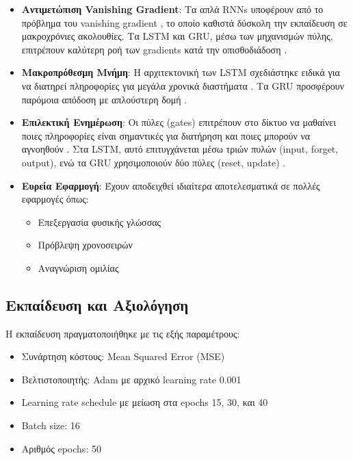 \documentclass[a4paper,12pt]{article}
\begin{document}
\begin{itemize}
    \item \textbf{Αντιμετώπιση Vanishing Gradient}: Τα απλά RNNs υποφέρουν από το πρόβλημα του vanishing gradient \cite{bengio1994learning}, το οποίο καθιστά δύσκολη την εκπαίδευση σε μακροχρόνιες ακολουθίες. Τα LSTM και GRU, μέσω των μηχανισμών πύλης, επιτρέπουν καλύτερη ροή των gradients κατά την οπισθοδιάδοση \cite{pascanu2013difficulty}.

    \item \textbf{Μακροπρόθεσμη Μνήμη}: Η αρχιτεκτονική των LSTM σχεδιάστηκε ειδικά για να διατηρεί πληροφορίες για μεγάλα χρονικά διαστήματα \cite{gers1999learning}. Τα GRU προσφέρουν παρόμοια απόδοση με απλούστερη δομή \cite{chung2014empirical}.

    \item \textbf{Επιλεκτική Ενημέρωση}: Οι πύλες (gates) επιτρέπουν στο δίκτυο να μαθαίνει ποιες πληροφορίες είναι σημαντικές για διατήρηση και ποιες μπορούν να αγνοηθούν \cite{greff2016lstm}. Στα LSTM, αυτό επιτυγχάνεται μέσω τριών πυλών (input, forget, output), ενώ τα GRU χρησιμοποιούν δύο πύλες (reset, update) \cite{cho2014properties}.

    \item \textbf{Ευρεία Εφαρμογή}: Έχουν αποδειχθεί ιδιαίτερα αποτελεσματικά σε πολλές εφαρμογές όπως:
          \begin{itemize}
              \item Επεξεργασία φυσικής γλώσσας \cite{sutskever2014sequence}
              \item Πρόβλεψη χρονοσειρών \cite{zhang2018deep}
              \item Αναγνώριση ομιλίας \cite{graves2013speech}
          \end{itemize}
\end{itemize}

\subsection*{Εκπαίδευση και Αξιολόγηση}

Η εκπαίδευση πραγματοποιήθηκε με τις εξής παραμέτρους:
\begin{itemize}
    \item Συνάρτηση κόστους: Mean Squared Error (MSE)
    \item Βελτιστοποιητής: Adam με αρχικό learning rate 0.001
    \item Learning rate schedule με μείωση στα epochs 15, 30, και 40
    \item Batch size: 16
    \item Αριθμός epochs: 50
\end{itemize}
\end{document}
